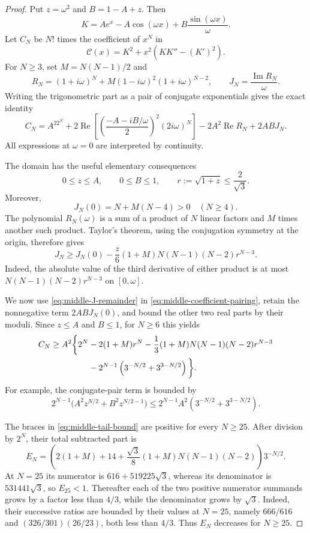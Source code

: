 \documentclass[11pt]{article}
\theoremstyle{remark}
\begin{document}
\begin{proof}
Put $z=\omega^2$ and $B=1-A+z$.  Then
\[
 K=Ae^x-A\cos(\omega x)+B\frac{\sin(\omega x)}{\omega}.
\]
Let $C_N$ be $N!$ times the coefficient of $x^N$ in
\[
 \mathcal C(x)=K^2+x^2(KK''-(K')^2).
\]
For $N\geq3$, set $M=N(N-1)/2$ and
\[
 R_N=(1+i\omega)^N
     +M(1-i\omega)^2(1+i\omega)^{N-2},
 \qquad J_N=\frac{\operatorname{Im}R_N}{\omega}.
\]
Writing the trigonometric part as a pair of conjugate exponentials gives the
exact identity
\begin{equation}\label{eq:middle-coefficient-pairing}
 C_N=A^22^N
 +2\operatorname{Re}\left[
   \left(\frac{-A-iB/\omega}{2}\right)^2(2i\omega)^N\right]
 -2A^2\operatorname{Re}R_N+2ABJ_N .
\end{equation}
All expressions at $\omega=0$ are interpreted by continuity.

The domain has the useful elementary consequences
\begin{equation}\label{eq:middle-domain-crude}
 0\leq z\leq A,\qquad 0\leq B\leq1,
 \qquad r:=\sqrt{1+z}\leq\frac2{\sqrt3}.
\end{equation}
Moreover,
\[
 J_N(0)=N+M(N-4)>0\quad(N\geq4).
\]
The polynomial $R_N(\omega)$ is a sum of a product of $N$ linear factors
and $M$ times another such product.  Taylor's theorem, using the conjugation
symmetry at the origin, therefore gives
\begin{equation}\label{eq:middle-J-remainder}
 J_N\geq J_N(0)-\frac z6(1+M)N(N-1)(N-2)r^{N-3}.
\end{equation}
Indeed, the absolute value of the third derivative of either product is at
most $N(N-1)(N-2)r^{N-3}$ on $[0,\omega]$.

We now use \eqref{eq:middle-J-remainder} in
\eqref{eq:middle-coefficient-pairing}, retain the nonnegative term
$2ABJ_N(0)$, and bound the other two real parts by their moduli.  Since
$z\leq A$ and $B\leq1$, for $N\geq6$ this yields
\begin{align}
 C_N\geq A^2\bigg\{2^N
 &-2(1+M)r^N
 -\frac13(1+M)N(N-1)(N-2)r^{N-3} \notag\\
 &-2^{N-1}\left(3^{-N/2}+3^{3-N/2}\right)\bigg\}.
 \label{eq:middle-tail-bound}
\end{align}
For example, the conjugate-pair term is bounded by
\[
 2^{N-1}\bigl(A^2z^{N/2}+B^2z^{N/2-1}\bigr)
 \leq
 2^{N-1}A^2\left(3^{-N/2}+3^{3-N/2}\right).
\]

The braces in \eqref{eq:middle-tail-bound} are positive for every
$N\geq25$.  After division by $2^N$, their total subtracted part is
\[
 E_N=\left(2(1+M)+14
 +\frac{\sqrt3}{8}(1+M)N(N-1)(N-2)\right)3^{-N/2}.
\]
At $N=25$ its numerator is
$616+519225\sqrt3$, whereas its denominator is $531441\sqrt3$, so
$E_{25}<1$.  Thereafter each of the two positive numerator summands grows
by a factor less than $4/3$, while the denominator grows by $\sqrt3$.
Indeed, their successive ratios are bounded by their values at $N=25$,
namely $666/616$ and $(326/301)(26/23)$, both less than $4/3$.
Thus $E_N$ decreases for $N\geq25$.


\end{proof}
\end{document}
